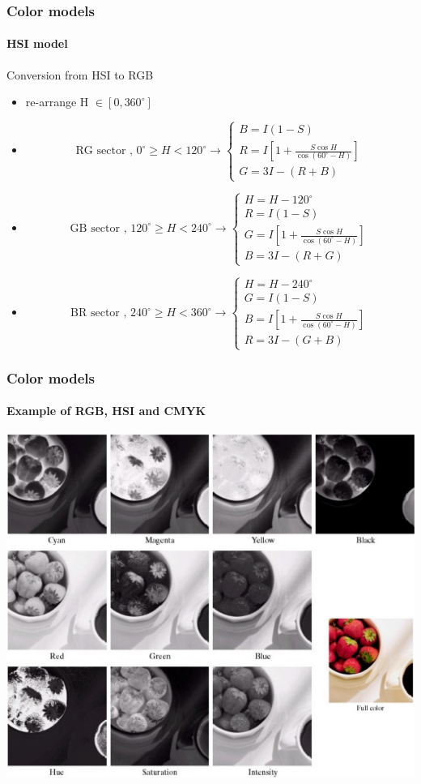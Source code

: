 \documentclass{beamer}
\begin{document}
\begin{frame}
\frametitle{Color models}
\framesubtitle{HSI model}
\begin{block}{Conversion from HSI to RGB}
\scriptsize{
\begin{itemize}
\item re-arrange H $\in [0, 360^{\circ}]$ 
\item[]
\[\text{RG sector  , } 
0^{\circ} \geq H < 120^{\circ} \rightarrow
\begin{cases}
B = I(1-S)\\
R =  I[1+\frac{S\cos H}{\cos(60^{\circ}-H)}]\\
G = 3I - (R+B)
\end{cases}
\]
\item[]
\[ \text{GB sector  , } 
120^{\circ} \geq H < 240^{\circ} \rightarrow
\begin{cases}
H = H - 120^{\circ}\\
R = I(1-S)\\
G =  I[1+\frac{S\cos H}{\cos(60^{\circ}-H)}]\\
B = 3I - (R+G)
\end{cases}
\]
\item[]
\[ \text{BR sector  , } 
240^{\circ} \geq H < 360^{\circ} \rightarrow
\begin{cases}
H = H - 240^{\circ}\\
G = I(1-S)\\
B =  I[1+\frac{S\cos H}{\cos(60^{\circ}-H)}]\\
R = 3I - (G+B)
\end{cases}
\]
\end{itemize}}
\end{block}
\end{frame}
\begin{frame}
\frametitle{Color models}
\framesubtitle{Example of RGB, HSI and CMYK}
\begin{center}
\includegraphics[scale= 0.27]{images/L6_ex_RGBCYMHSI.png}
\end{center}
\end{frame}
\end{document}
